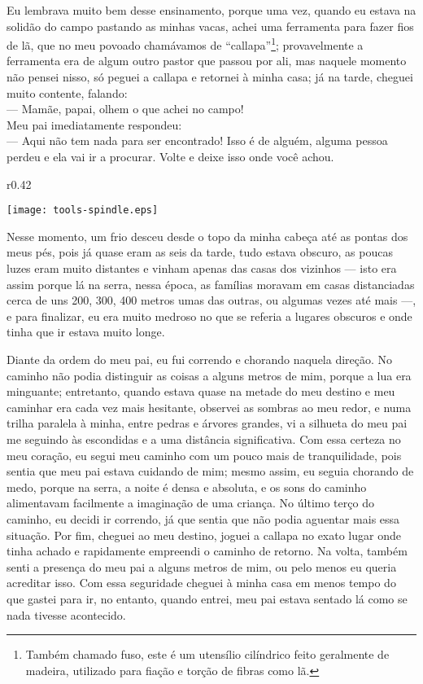 Eu lembrava muito bem desse ensinamento, porque uma vez, quando eu estava na solidão do campo pastando as minhas vacas, achei uma ferramenta para fazer fios de lã, que no meu povoado chamávamos de ``callapa''\footnote{Também chamado fuso, este é um utensílio cilíndrico feito geralmente de madeira, utilizado para fiação e torção de fibras como lã.}; provavelmente a ferramenta era de algum outro pastor que passou por ali, mas naquele momento não pensei nisso, só peguei a callapa e retornei à minha casa; já na tarde, cheguei  muito contente, falando:\\\indent
--- Mamãe, papai, olhem o que achei no campo!\\\indent
Meu pai imediatamente respondeu:\\\indent
--- Aqui não tem nada para ser encontrado! Isso é de alguém, alguma pessoa perdeu e ela vai ir a procurar. Volte e deixe isso onde você achou.

\ifdefined\EnableIncludeImages
\begin{wrapfigure}{r}{0.42\textwidth}
  \begin{center}
  \vspace{-10pt}
    \texttt{[image: tools-spindle.eps]}
  \end{center}
  \vspace{-20pt}
\end{wrapfigure}
\fi
Nesse momento, um frio desceu desde o topo da minha cabeça até as pontas dos meus pés, pois já quase eram as seis da tarde, tudo estava obscuro, as poucas luzes eram muito distantes e vinham apenas das casas dos vizinhos --- isto era assim porque lá na serra, nessa época, as famílias moravam em casas distanciadas cerca de uns 200, 300, 400 metros umas das outras, ou algumas vezes até mais ---, e para finalizar, eu era muito medroso no que se referia a lugares obscuros e onde tinha que ir estava muito longe.

Diante da ordem do meu pai, eu fui correndo e chorando naquela direção. No caminho não podia distinguir as coisas a alguns metros de mim, porque a lua era minguante; entretanto, quando estava quase na metade do meu destino e meu caminhar era cada vez mais hesitante, observei as sombras ao meu redor, e numa trilha paralela à minha, entre pedras e árvores grandes, vi a silhueta do meu pai me seguindo às escondidas e a uma distância significativa.
Com essa certeza no meu coração, eu segui meu caminho com um pouco mais de tranquilidade, pois sentia que meu pai estava cuidando de mim; mesmo assim, eu seguia chorando de medo, porque na serra, a noite é densa e absoluta, e os sons do caminho alimentavam facilmente a imaginação de uma criança.
No último terço do caminho, eu decidi ir correndo, já que sentia que não podia aguentar mais essa situação. Por fim, cheguei ao meu destino, joguei a callapa no exato lugar onde tinha achado e rapidamente empreendi o caminho de retorno.
Na volta, também senti a presença do meu pai a alguns metros de mim, ou pelo menos eu queria acreditar isso. Com essa seguridade cheguei à minha casa em menos tempo do que gastei para ir, no entanto, quando entrei, meu pai estava sentado lá como se nada tivesse acontecido.


